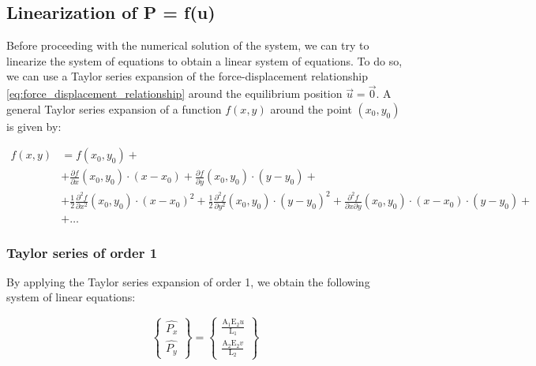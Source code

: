 \subsection{Linearization of P = f(u)}
\label{subsec:linearization}

Before proceeding with the numerical solution of the system, we can try to linearize the system of equations to obtain a linear system of equations.
To do so, we can use a Taylor series expansion of the force-displacement relationship \ref{eq:force_displacement_relationship} around the equilibrium position $\vec{u} = \vec{0}$.
A general Taylor series expansion of a function $f(x, y)$ around the point $(x_0, y_0)$ is given by:

\begin{align}
    f(x, y) & = f(x_0, y_0) + \nonumber                                                                                                                                                                                                                                  \\
            & + \frac{\partial f}{\partial x}(x_0, y_0) \cdot (x - x_0) + \frac{\partial f}{\partial y}(x_0, y_0) \cdot (y - y_0) + \nonumber                                                                                                                            \\
            & + \frac{1}{2} \frac{\partial^2 f}{\partial x^2}(x_0, y_0) \cdot (x - x_0)^2 + \frac{1}{2} \frac{\partial^2 f}{\partial y^2}(x_0, y_0) \cdot (y - y_0)^2 + \frac{\partial^2 f}{\partial x \partial y}(x_0, y_0) \cdot (x - x_0) \cdot (y - y_0) + \nonumber \\
            & + \dots
    \label{eq:taylor_series_expansion}
\end{align}


\subsubsection{Taylor series of order 1}

By applying the Taylor series expansion of order 1, we obtain the following system of linear equations:

\begin{equation}
    \begin{Bmatrix}
        \widehat{P_x} \\
        \widehat{P_y}
    \end{Bmatrix}
    =
    \begin{Bmatrix}
        \frac{\text{A}_1 \text{E}_2 u}{\text{L}_1} \\
        \frac{\text{A}_2 \text{E}_2 v}{\text{L}_2}
    \end{Bmatrix}
    \label{eq:taylor_series_expansion_order_1}
\end{equation}


